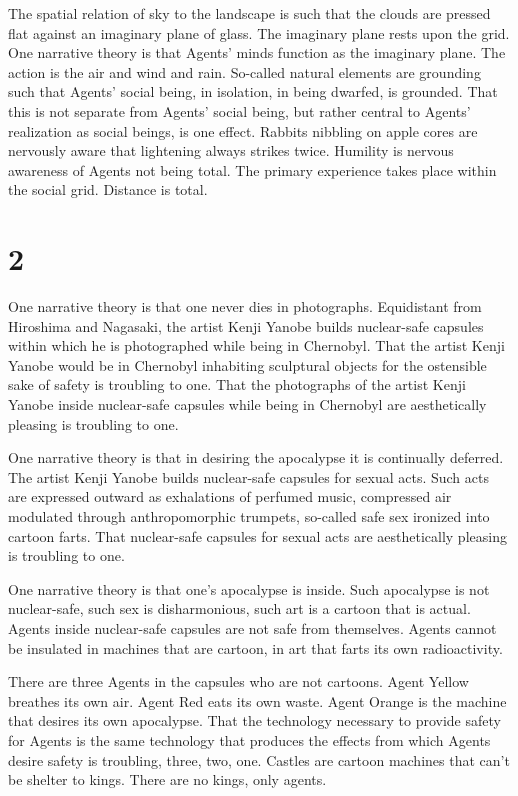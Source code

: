 \documentclass[
]{memoir}
\begin{document}
The spatial relation of sky to the landscape is such that the clouds are
pressed flat against an imaginary plane of glass. The imaginary plane
rests upon the grid. One narrative theory is that Agents' minds function
as the imaginary plane. The action is the air and wind and rain.
So-called natural elements are grounding such that Agents' social being,
in isolation, in being dwarfed, is grounded. That this is not separate
from Agents' social being, but rather central to Agents' realization as
social beings, is one effect. Rabbits nibbling on apple cores are
nervously aware that lightening always strikes twice. Humility is
nervous awareness of Agents not being total. The primary experience
takes place within the social grid. Distance is total.

\hypertarget{section-3}{%
\section*{2}\label{section-3}}

One narrative theory is that one never dies in photographs. Equidistant
from Hiroshima and Nagasaki, the artist Kenji Yanobe builds nuclear-safe
capsules within which he is photographed while being in Chernobyl. That
the artist Kenji Yanobe would be in Chernobyl inhabiting sculptural
objects for the ostensible sake of safety is troubling to one. That the
photographs of the artist Kenji Yanobe inside nuclear-safe capsules
while being in Chernobyl are aesthetically pleasing is troubling to one.

One narrative theory is that in desiring the apocalypse it is
continually deferred. The artist Kenji Yanobe builds nuclear-safe
capsules for sexual acts. Such acts are expressed outward as exhalations
of perfumed music, compressed air modulated through anthropomorphic
trumpets, so-called safe sex ironized into cartoon farts. That
nuclear-safe capsules for sexual acts are aesthetically pleasing is
troubling to one.

One narrative theory is that one's apocalypse is inside. Such apocalypse
is not nuclear-safe, such sex is disharmonious, such art is a cartoon
that is actual. Agents inside nuclear-safe capsules are not safe from
themselves. Agents cannot be insulated in machines that are cartoon, in
art that farts its own radioactivity.

There are three Agents in the capsules who are not cartoons. Agent
Yellow breathes its own air. Agent Red eats its own waste. Agent Orange
is the machine that desires its own apocalypse. That the technology
necessary to provide safety for Agents is the same technology that
produces the effects from which Agents desire safety is troubling,
three, two, one. Castles are cartoon machines that can't be shelter to
kings. There are no kings, only agents.
\end{document}
